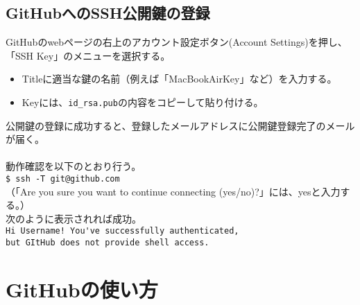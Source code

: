 \documentclass[11pt, oneside]{article}   	%
\begin{document}
\subsection{GitHubへのSSH公開鍵の登録}
GitHubのwebページの右上のアカウント設定ボタン(Account Settings)を押し、「SSH Key」のメニューを選択する。
\begin {itemize}
\item Titleに適当な鍵の名前（例えば「MacBookAirKey」など）を入力する。
\item Keyには、\verb|id_rsa.pub|の内容をコピーして貼り付ける。
\end{itemize}
公開鍵の登録に成功すると、登録したメールアドレスに公開鍵登録完了のメールが届く。\\ \\
動作確認を以下のとおり行う。\\ 
\verb|$ ssh -T git@github.com|\\
（「Are you sure you want to continue connecting (yes/no)?」には、yesと入力する。）\\
次のように表示されれば成功。\\
\verb|Hi Username! You've successfully authenticated, |\\
\verb|but GItHub does not provide shell access.|\\


\section{GitHubの使い方}




\verb||\\




\verb||
\end{document}
